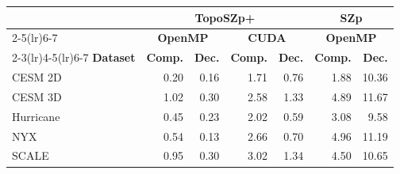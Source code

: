 \begin{tabular}{@{}lrrrrrr@{}}
\toprule
 & \multicolumn{4}{c}{\textbf{TopoSZp+}} & \multicolumn{2}{c}{\textbf{SZp}} \\
\cmidrule(lr){2-5}\cmidrule(lr){6-7}
 & \multicolumn{2}{c}{\textbf{OpenMP}} & \multicolumn{2}{c}{\textbf{CUDA}} & \multicolumn{2}{c}{\textbf{OpenMP}} \\
\cmidrule(lr){2-3}\cmidrule(lr){4-5}\cmidrule(lr){6-7}
\textbf{Dataset} & \textbf{Comp.} & \textbf{Dec.} & \textbf{Comp.} & \textbf{Dec.} & \textbf{Comp.} & \textbf{Dec.} \\
\midrule
CESM 2D & 0.20 & 0.16 & 1.71 & 0.76 & 1.88 & 10.36 \\
CESM 3D & 1.02 & 0.30 & 2.58 & 1.33 & 4.89 & 11.67 \\
Hurricane & 0.45 & 0.23 & 2.02 & 0.59 & 3.08 & 9.58 \\
NYX & 0.54 & 0.13 & 2.66 & 0.70 & 4.96 & 11.19 \\
SCALE & 0.95 & 0.30 & 3.02 & 1.34 & 4.50 & 10.65 \\
\bottomrule
\end{tabular}
